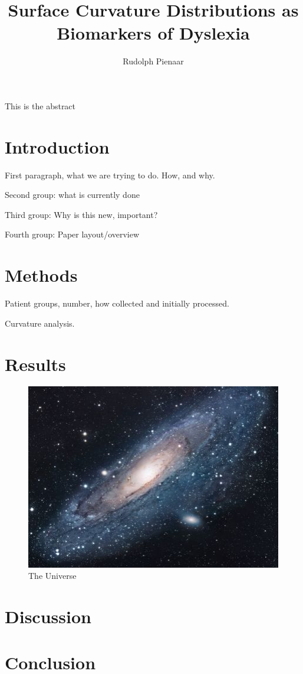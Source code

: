 \documentclass{article}
\title{Surface Curvature Distributions as Biomarkers of Dyslexia}
\author{Rudolph Pienaar}
\date{}
\begin{document}
\maketitle

\abstract

This is the abstract

\section{Introduction}

First paragraph, what we are trying to do. How, and why.

Second group: what is currently done

Third group: Why is this new, important?

Fourth group: Paper layout/overview

\section{Methods}

Patient groups, number, how collected and initially processed.

Curvature analysis.

\section{Results}

\begin{figure}[h!]
\centering
\includegraphics[scale=1.7]{fig-1.jpg}
\caption{The Universe}
\label{threadsVsSync}
\end{figure}

\section{Discussion}


\section{Conclusion}



\end{document}
